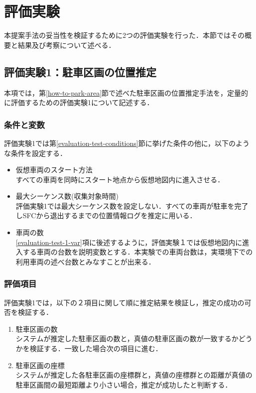 \section{評価実験}
\label{evaluation-test-about}
本提案手法の妥当性を検証するために2つの評価実験を行った．本節ではその概要と結果及び考察について述べる．
\subsection{評価実験1：駐車区画の位置推定}
\label{evaluation-test-1}
本項では，第\ref{how-to-park-area}節で述べた駐車区画の位置推定手法を，定量的に評価するための評価実験1について記述する．
\subsubsection{条件と変数}
評価実験1では第\ref{evaluation-test-conditions}節に挙げた条件の他に，以下のような条件を設定する．
\begin{itemize}
	\item 仮想車両のスタート方法\\
		すべての車両を同時にスタート地点から仮想地図内に進入させる．
	\item 最大シーケンス数(収集対象時間) \\
	      評価実験1では最大シーケンス数を設定しない．すべての車両が駐車を完了しSFCから退出するまでの位置情報ログを推定に用いる．
	\item 車両の数\\
	      \ref{evaluation-test-1-var}項に後述するように，評価実験１では仮想地図内に進入する車両の台数を説明変数とする．本実験での車両台数は，実環境下での利用車両の述べ台数とみなすことが出来る．
\end{itemize}
\subsubsection{評価項目}
\label{evaluation-test-1-eval-elements}
評価実験1では，以下の２項目に関して順に推定結果を検証し，推定の成功の可否を検証する．
\begin{enumerate}
	\item 駐車区画の数 \\
	      システムが推定した駐車区画の数と，真値の駐車区画の数が一致するかどうかを検証する．一致した場合次の項目に進む．
	\item 駐車区画の座標 \\
	      システムが推定した各駐車区画の座標群と，真値の座標群との距離が真値の駐車区画間の最短距離より小さい場合，推定が成功したと判断する．
\end{enumerate}

